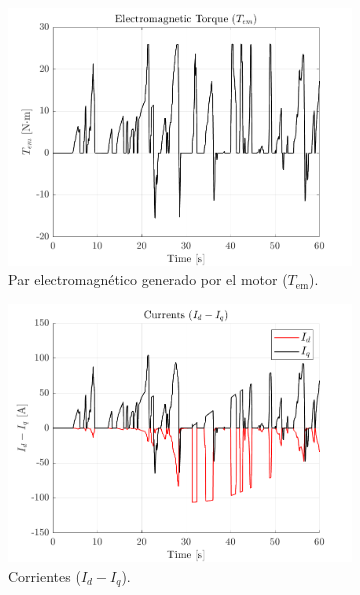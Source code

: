 \begin{figure}[!htb]
    \centering
    \begin{subfigure}{0.4\textwidth}
        \includegraphics[width=\linewidth]{fig/Tem_plot.png}
        \caption{Par electromagnético generado por el motor ($T_{\text{em}}$).}
    \end{subfigure}
    \begin{subfigure}{0.4\textwidth}
        \includegraphics[width=\linewidth]{fig/idiq_plot.png}
        \caption{Corrientes ($I_{d} - I_{q}$).}
    \end{subfigure}
    \begin{subfigure}{0.4\textwidth}

\end{subfigure}
\end{figure}
